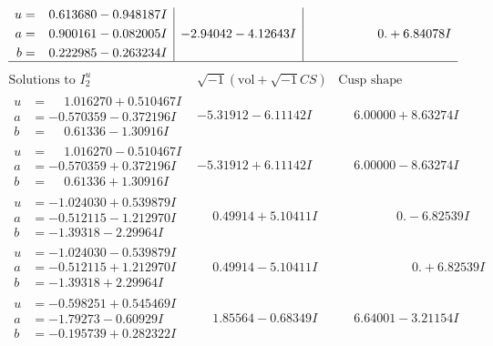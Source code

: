 \documentclass[1p]{elsarticle_modified}
\theoremstyle{definition}
\newcommand{\I}{\sqrt{-1}}
\begin{document}
$$\begin{array}{c|c|c}
\begin{aligned}
u &= \phantom{-}0.613680 - 0.948187 I \\
a &= \phantom{-}0.900161 - 0.082005 I \\
b &= \phantom{-}0.222985 - 0.263234 I\end{aligned}
 & -2.94042 - 4.12643 I & \phantom{-0.000000 -}0. + 6.84078 I\\
 \hline 
 \end{array}$$\newpage$$\begin{array}{c|c|c}  
\text{Solutions to }I^u_{2}& \I (\text{vol} + \sqrt{-1}CS) & \text{Cusp shape}\\
 \hline 
\begin{aligned}
u &= \phantom{-}1.016270 + 0.510467 I \\
a &= -0.570359 - 0.372196 I \\
b &= \phantom{-}0.61336 - 1.30916 I\end{aligned}
 & -5.31912 - 6.11142 I & \phantom{-}6.00000 + 8.63274 I \\ \hline\begin{aligned}
u &= \phantom{-}1.016270 - 0.510467 I \\
a &= -0.570359 + 0.372196 I \\
b &= \phantom{-}0.61336 + 1.30916 I\end{aligned}
 & -5.31912 + 6.11142 I & \phantom{-}6.00000 - 8.63274 I \\ \hline\begin{aligned}
u &= -1.024030 + 0.539879 I \\
a &= -0.512115 - 1.212970 I \\
b &= -1.39318 - 2.29964 I\end{aligned}
 & \phantom{-}0.49914 + 5.10411 I & \phantom{-0.000000 } 0. - 6.82539 I \\ \hline\begin{aligned}
u &= -1.024030 - 0.539879 I \\
a &= -0.512115 + 1.212970 I \\
b &= -1.39318 + 2.29964 I\end{aligned}
 & \phantom{-}0.49914 - 5.10411 I & \phantom{-0.000000 -}0. + 6.82539 I \\ \hline\begin{aligned}
u &= -0.598251 + 0.545469 I \\
a &= -1.79273 - 0.60929 I \\
b &= -0.195739 + 0.282322 I\end{aligned}
 & \phantom{-}1.85564 - 0.68349 I & \phantom{-}6.64001 - 3.21154 I \\ \hline\begin{aligned}

\end{aligned}
\end{array}$$
\end{document}
